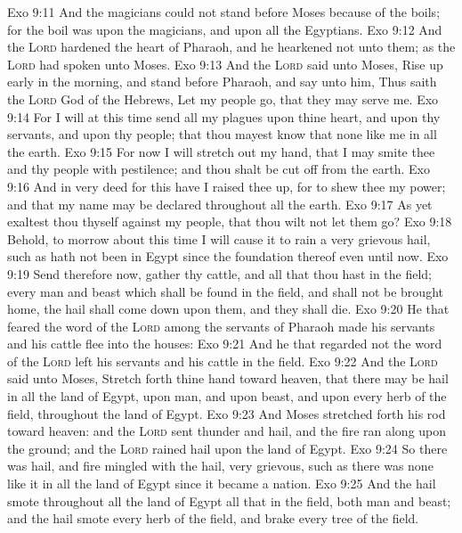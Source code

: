 \vs Exo 9:11 And the magicians could not stand before Moses because of the boils; for the boil was upon the magicians, and upon all the Egyptians.
\vs Exo 9:12 And the \textsc{Lord} hardened the heart of Pharaoh, and he hearkened not unto them; as the \textsc{Lord} had spoken unto Moses.
\vs Exo 9:13 And the \textsc{Lord} said unto Moses, Rise up early in the morning, and stand before Pharaoh, and say unto him, Thus saith the \textsc{Lord} God of the Hebrews, Let my people go, that they may serve me.
\vs Exo 9:14 For I will at this time send all my plagues upon thine heart, and upon thy servants, and upon thy people; that thou mayest know that  none like me in all the earth.
\vs Exo 9:15 For now I will stretch out my hand, that I may smite thee and thy people with pestilence; and thou shalt be cut off from the earth.
\vs Exo 9:16 And in very deed for this  have I raised thee up, for to shew  thee my power; and that my name may be declared throughout all the earth.
\vs Exo 9:17 As yet exaltest thou thyself against my people, that thou wilt not let them go?
\vs Exo 9:18 Behold, to morrow about this time I will cause it to rain a very grievous hail, such as hath not been in Egypt since the foundation thereof even until now.
\vs Exo 9:19 Send therefore now,  gather thy cattle, and all that thou hast in the field;  every man and beast which shall be found in the field, and shall not be brought home, the hail shall come down upon them, and they shall die.
\vs Exo 9:20 He that feared the word of the \textsc{Lord} among the servants of Pharaoh made his servants and his cattle flee into the houses:
\vs Exo 9:21 And he that regarded not the word of the \textsc{Lord} left his servants and his cattle in the field.
\vs Exo 9:22 And the \textsc{Lord} said unto Moses, Stretch forth thine hand toward heaven, that there may be hail in all the land of Egypt, upon man, and upon beast, and upon every herb of the field, throughout the land of Egypt.
\vs Exo 9:23 And Moses stretched forth his rod toward heaven: and the \textsc{Lord} sent thunder and hail, and the fire ran along upon the ground; and the \textsc{Lord} rained hail upon the land of Egypt.
\vs Exo 9:24 So there was hail, and fire mingled with the hail, very grievous, such as there was none like it in all the land of Egypt since it became a nation.
\vs Exo 9:25 And the hail smote throughout all the land of Egypt all that  in the field, both man and beast; and the hail smote every herb of the field, and brake every tree of the field.
